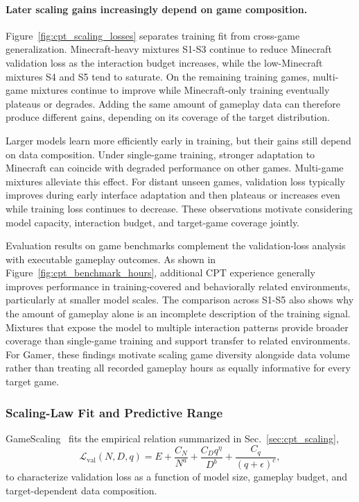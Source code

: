 \paragraph{Later scaling gains increasingly depend on game composition.}
Figure~\ref{fig:cpt_scaling_losses} separates training fit from cross-game generalization.
Minecraft-heavy mixtures S1-S3 continue to reduce Minecraft validation loss as the interaction budget increases, while the low-Minecraft mixtures S4 and S5 tend to saturate.
On the remaining training games, multi-game mixtures continue to improve while Minecraft-only training eventually plateaus or degrades.
Adding the same amount of gameplay data can therefore produce different gains, depending on its coverage of the target distribution.

Larger models learn more efficiently early in training, but their gains still depend on data composition.
Under single-game training, stronger adaptation to Minecraft can coincide with degraded performance on other games.
Multi-game mixtures alleviate this effect.
For distant unseen games, validation loss typically improves during early interface adaptation and then plateaus or increases even while training loss continues to decrease.
These observations motivate considering model capacity, interaction budget, and target-game coverage jointly.


Evaluation results on game benchmarks complement the validation-loss analysis with executable gameplay outcomes. As shown in Figure~\ref{fig:cpt_benchmark_hours}, additional CPT experience generally improves performance in training-covered and behaviorally related environments, particularly at smaller model scales. The comparison across S1-S5 also shows why the amount of gameplay alone is an incomplete description of the training signal. Mixtures that expose the model to multiple interaction patterns provide broader coverage than single-game training and support transfer to related environments. For Gamer, these findings motivate scaling game diversity alongside data volume rather than treating all recorded gameplay hours as equally informative for every target game.

\subsubsection{Scaling-Law Fit and Predictive Range}

GameScaling~\cite{gamescaling} fits the empirical relation summarized in Sec.~\ref{sec:cpt_scaling},
\begin{equation}
\mathcal{L}_{\mathrm{val}}(N,D,q)
=
E
+
\frac{C_N}{N^a}
+
\frac{C_D q^\eta}{D^b}
+
\frac{C_q}{(q+\epsilon)^c},
\label{eq:exp_scaling_law}
\end{equation}
to characterize validation loss as a function of model size, gameplay budget, and target-dependent data composition.

